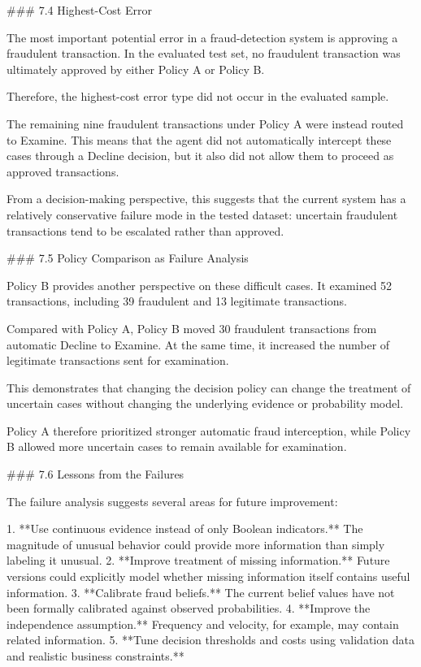 ### 7.4 Highest-Cost Error

The most important potential error in a fraud-detection system is approving a fraudulent transaction. In the evaluated test set, no fraudulent transaction was ultimately approved by either Policy A or Policy B.

Therefore, the highest-cost error type did not occur in the evaluated sample.

The remaining nine fraudulent transactions under Policy A were instead routed to Examine. This means that the agent did not automatically intercept these cases through a Decline decision, but it also did not allow them to proceed as approved transactions.

From a decision-making perspective, this suggests that the current system has a relatively conservative failure mode in the tested dataset: uncertain fraudulent transactions tend to be escalated rather than approved.

### 7.5 Policy Comparison as Failure Analysis

Policy B provides another perspective on these difficult cases. It examined 52 transactions, including 39 fraudulent and 13 legitimate transactions.

Compared with Policy A, Policy B moved 30 fraudulent transactions from automatic Decline to Examine. At the same time, it increased the number of legitimate transactions sent for examination.

This demonstrates that changing the decision policy can change the treatment of uncertain cases without changing the underlying evidence or probability model.

Policy A therefore prioritized stronger automatic fraud interception, while Policy B allowed more uncertain cases to remain available for examination.

### 7.6 Lessons from the Failures

The failure analysis suggests several areas for future improvement:

1. **Use continuous evidence instead of only Boolean indicators.** The magnitude of unusual behavior could provide more information than simply labeling it unusual.
2. **Improve treatment of missing information.** Future versions could explicitly model whether missing information itself contains useful information.
3. **Calibrate fraud beliefs.** The current belief values have not been formally calibrated against observed probabilities.
4. **Improve the independence assumption.** Frequency and velocity, for example, may contain related information.
5. **Tune decision thresholds and costs using validation data and realistic business constraints.**


